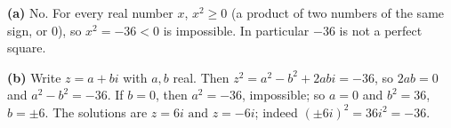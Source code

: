 \textbf{(a)} No. For every real number $x$, $x^2\ge0$ (a product of two numbers of the same sign, or $0$), so $x^2=-36<0$ is impossible. In particular $-36$ is not a perfect square.

\textbf{(b)} Write $z=a+bi$ with $a,b$ real. Then $z^2=a^2-b^2+2abi=-36$, so $2ab=0$ and $a^2-b^2=-36$. If $b=0$, then $a^2=-36$, impossible; so $a=0$ and $b^2=36$, $b=\pm6$. The solutions are $\boxed{z=6i\text{ and }z=-6i}$; indeed $(\pm6i)^2=36i^2=-36$.
